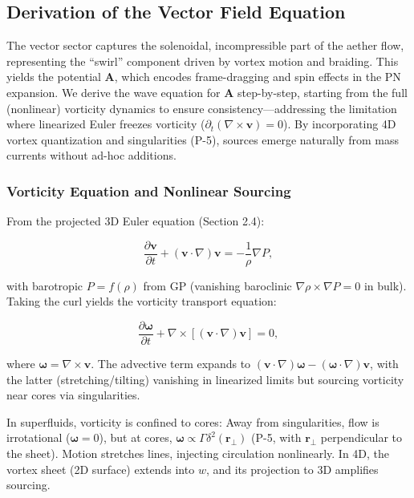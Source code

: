 \documentclass{article}
\begin{document}
\subsection{Derivation of the Vector Field Equation}

The vector sector captures the solenoidal, incompressible part of the aether flow, representing the ``swirl'' component driven by vortex motion and braiding. This yields the potential $\mathbf{A}$, which encodes frame-dragging and spin effects in the PN expansion. We derive the wave equation for $\mathbf{A}$ step-by-step, starting from the full (nonlinear) vorticity dynamics to ensure consistency---addressing the limitation where linearized Euler freezes vorticity ($\partial_t (\nabla \times \mathbf{v}) = 0$). By incorporating 4D vortex quantization and singularities (P-5), sources emerge naturally from mass currents without ad-hoc additions.

\subsubsection{Vorticity Equation and Nonlinear Sourcing}

From the projected 3D Euler equation (Section 2.4):

\[
\frac{\partial \mathbf{v}}{\partial t} + (\mathbf{v} \cdot \nabla) \mathbf{v} = -\frac{1}{\rho} \nabla P,
\]

with barotropic $P = f(\rho)$ from GP (vanishing baroclinic $\nabla \rho \times \nabla P = 0$ in bulk). Taking the curl yields the vorticity transport equation:

\[
\frac{\partial \boldsymbol{\omega}}{\partial t} + \nabla \times [(\mathbf{v} \cdot \nabla) \mathbf{v}] = 0,
\]

where $\boldsymbol{\omega} = \nabla \times \mathbf{v}$. The advective term expands to $(\mathbf{v} \cdot \nabla) \boldsymbol{\omega} - (\boldsymbol{\omega} \cdot \nabla) \mathbf{v}$, with the latter (stretching/tilting) vanishing in linearized limits but sourcing vorticity near cores via singularities.

In superfluids, vorticity is confined to cores: Away from singularities, flow is irrotational ($\boldsymbol{\omega} = 0$), but at cores, $\boldsymbol{\omega} \propto \Gamma \delta^2(\mathbf{r}_\perp)$ (P-5, with $\mathbf{r}_\perp$ perpendicular to the sheet). Motion stretches lines, injecting circulation nonlinearly. In 4D, the vortex sheet (2D surface) extends into $w$, and its projection to 3D amplifies sourcing.
\end{document}
